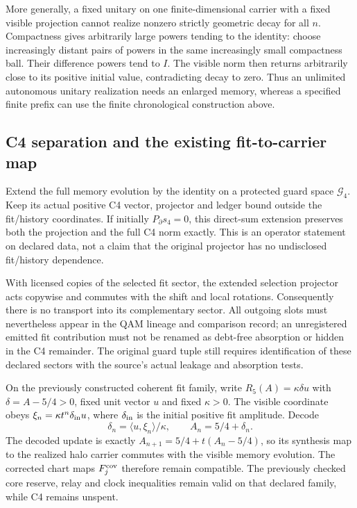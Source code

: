 \documentclass[11pt,a4paper]{article}
\begin{document}
More generally, a fixed unitary on one finite-dimensional carrier with
a fixed visible projection cannot realize nonzero strictly geometric
decay for all $n$. Compactness gives arbitrarily large powers tending
to the identity: choose increasingly distant pairs of powers in the
same increasingly small compactness ball. Their difference powers tend
to $I$. The visible norm then returns arbitrarily close to its positive
initial value, contradicting decay to zero. Thus an unlimited autonomous
unitary realization needs an enlarged memory, whereas a specified finite
prefix can use the finite chronological construction above.

\subsection{C4 separation and the existing fit-to-carrier map}
Extend the full memory evolution by the identity on a protected guard
space $\mathcal G_4$. Keep its actual positive C4 vector, projector and
ledger bound outside the fit/history coordinates. If initially
$P_\partial s_4=0$, this direct-sum extension preserves both the
projection and the full C4 norm exactly. This is an operator statement
on declared data, not a claim that the original projector has no
undisclosed fit/history dependence.

With licensed copies of the selected fit sector, the extended selection
projector acts copywise and commutes with the shift and local rotations.
Consequently there is no transport into its complementary sector.
All outgoing slots must nevertheless appear in the QAM lineage and
comparison record; an unregistered emitted fit contribution must not be renamed
as debt-free absorption or hidden in the C4 remainder. The original
guard tuple still requires identification of these declared sectors
with the source's actual leakage and absorption tests.

On the previously constructed coherent fit family, write
$R_5(A)=\kappa\delta u$ with $\delta=A-5/4>0$, fixed unit vector $u$
and fixed $\kappa>0$. The visible coordinate obeys
$\xi_n=\kappa t^n\delta_{\rm in}u$, where $\delta_{\rm in}$ is the
initial positive fit amplitude. Decode
\[
 \delta_n=\langle u,\xi_n\rangle/\kappa,
 \qquad A_n=5/4+\delta_n.
\]
The decoded update is exactly
$A_{n+1}=5/4+t(A_n-5/4)$, so its synthesis map to the realized halo
carrier commutes with the visible memory evolution. The corrected
chart maps $F_j^{\rm cov}$ therefore remain compatible. The previously
checked core reserve, relay and clock inequalities remain valid on
that declared family, while C4 remains unspent.
\end{document}
